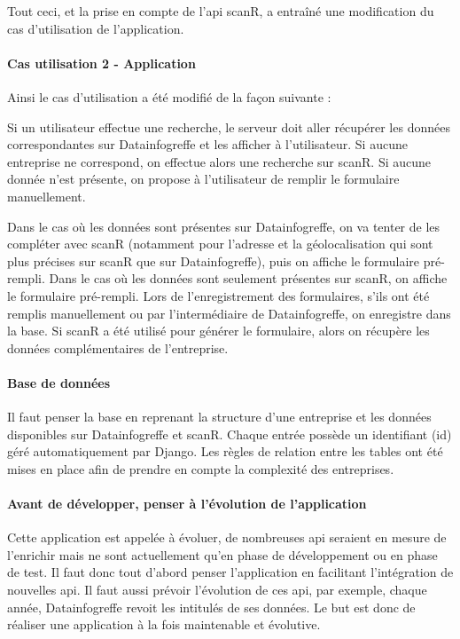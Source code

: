 \documentclass[french]{article}
\begin{document}
{Tout ceci, et la prise en compte de l'api scanR, a entraîné une modification du cas d'utilisation de l'application.

\paragraph{Cas utilisation 2 - Application}

Ainsi le cas d'utilisation a été modifié de la façon suivante :

Si un utilisateur effectue une recherche, le serveur doit aller récupérer les données correspondantes sur Datainfogreffe et les afficher à l'utilisateur. Si aucune entreprise ne correspond, on effectue  alors une recherche sur scanR. Si aucune donnée n'est présente, on propose à l'utilisateur de remplir le formulaire manuellement. 

Dans le cas où les données sont présentes sur Datainfogreffe, on va tenter de les compléter avec scanR (notamment pour l'adresse et la géolocalisation qui sont plus précises sur scanR que sur Datainfogreffe), puis on affiche le formulaire pré-rempli. Dans le cas où les données sont seulement présentes sur scanR, on affiche le formulaire pré-rempli. Lors de l'enregistrement des formulaires, s'ils ont été remplis manuellement ou par l'intermédiaire de Datainfogreffe, on enregistre dans la base. Si scanR a été utilisé pour générer le formulaire, alors on récupère les données complémentaires de l'entreprise.

\paragraph{Base de données}

Il faut penser la base en reprenant la structure d'une entreprise et les données disponibles sur Datainfogreffe et scanR. Chaque entrée possède un identifiant (id) géré automatiquement par Django. Les règles de relation entre les tables ont été mises en place afin de prendre en compte la complexité des entreprises.

\paragraph{Avant de développer, penser à l'évolution de l'application} Cette application est appelée à évoluer, de nombreuses api seraient en mesure de l'enrichir mais ne sont actuellement qu'en phase de développement ou en phase de test. Il faut donc tout d'abord penser l'application en facilitant l'intégration de nouvelles api. Il faut aussi prévoir l'évolution de ces api, par exemple, chaque année, Datainfogreffe revoit les intitulés de ses données. Le but est donc de réaliser une application à la fois maintenable et évolutive. 

}
\end{document}
